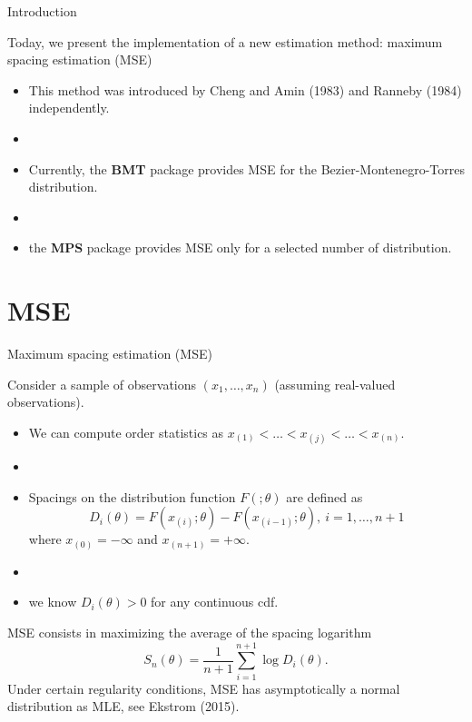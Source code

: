 \documentclass[8pt, hide notes]{beamer}
\newcommand{\pkg}{\textbf}
\begin{document}
\begin{frame}{Introduction}


Today, we present the implementation of a new estimation method: maximum spacing estimation (MSE) 
\begin{itemize}
\item This method was introduced by Cheng and Amin (1983) and Ranneby (1984) independently.
\item[]
\item Currently, the \pkg{BMT} package provides MSE for the Bezier-Montenegro-Torres distribution.
\item[]
\item the \pkg{MPS} package provides MSE only for a selected number of distribution.
\end{itemize}


\end{frame}


\section{MSE}

\begin{frame}{Maximum spacing estimation (MSE)}

Consider a sample of observations $(x_1,\dots, x_n)$ (assuming real-valued observations).
\bigskip

\begin{itemize}
\item
We can compute order statistics as $x_{(1)}<\dots<x_{(j)}<\dots<x_{(n)}$.
\item[]
\item 
Spacings on the distribution function $F(;\theta)$ are defined as
$$
D_i(\theta) = F(x_{(i)}; \theta)-F(x_{(i-1)}; \theta), ~i=1,\dots,n+1
$$
where $x_{(0)}=-\infty$ and  $x_{(n+1)}=+\infty$.
\item[]
\item we know $D_i(\theta)>0$ for any continuous cdf.
\end{itemize}
\bigskip

\pause

MSE consists in maximizing the average of the spacing logarithm
$$
S_n(\theta) = \frac1{n+1} \sum_{i=1}^{n+1} \log D_i(\theta).
$$
Under certain regularity conditions, MSE has asymptotically a normal distribution as MLE, 
see Ekstrom (2015).

\end{frame}
\end{document}
